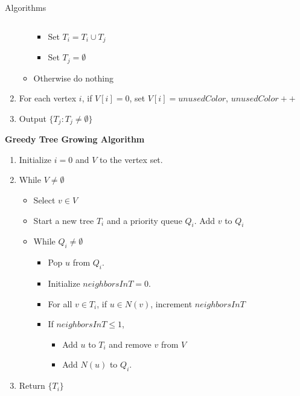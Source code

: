 \documentclass[serif,mathserif,final]{beamer}
\begin{document}
\begin{frame}{}
\begin{columns}[t]
\begin{column}{0.49\linewidth}
\begin{block}{\Huge Algorithms}
\begin{columns}[t]
\begin{column}{0.47\linewidth}
\begin{framed}
\begin{enumerate}
\begin{itemize}
\begin{itemize}
\item Set $T_i=T_i\cup T_j$
\item Set $T_j=\emptyset$
\end{itemize}
\item Otherwise do nothing
\end{itemize}
\item For each vertex $i$, if $V[i]=0$, set $V[i]=unusedColor$, $unusedColor++$
\item Output $\{T_j:T_j\neq\emptyset\}$
\end{enumerate}
\end{framed}

\begin{framed}
\noindent\textbf{\Large Greedy Tree Growing Algorithm} %
\begin{enumerate}
\Large
\item Initialize $i=0$ and $V$ to the vertex set.
\item While $V\neq\emptyset$
\begin{itemize}
\large
\item Select $v\in V$
\item Start a new tree $T_i$ and a priority queue $Q_i$. Add $v$ to $Q_i$
\item While $Q_i\neq\emptyset$
\begin{itemize}
\normalsize
\item Pop $u$ from $Q_i$.
\item Initialize $neighborsInT=0$.
\item For all $v\in T_i$, if $u\in N(v)$, increment $neighborsInT$
\item If $neighborsInT\le1$,
\begin{itemize}
\item Add $u$ to $T_i$ and remove $v$ from $V$
\item Add $N(u)$ to $Q_i$.
\end{itemize}
\end{itemize}
\end{itemize}
\item Return $\{T_i\}$
\end{enumerate}
\end{framed}

			\end{column}
			\begin{column}{0.51\linewidth}


\end{column}
\end{columns}
\end{block}
\end{column}
\end{columns}
\end{frame}
\end{document}
